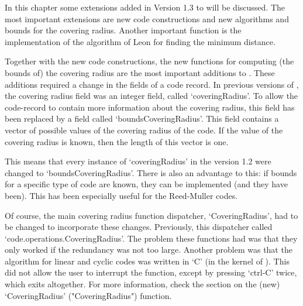 %
%
%
%

In this chapter some extensions added in Version 1.3 to {\GUAVA} will  be
discussed. The most important extensions are new code  constructions  and
new algorithms and bounds for  the  covering  radius.  Another  important
function is the implementation of the algorithm of Leon for  finding  the
minimum distance.


Together with the new code constructions, the new functions for computing
(the bounds of) the covering radius are the most important  additions  to
{\GUAVA}.
These additions required a change in the fields  of  a  code  record.  In
previous versions of {\GUAVA}, the covering radius field was  an  integer
field, called `coveringRadius'. To allow the code-record to contain  more
information about the covering radius, this field has been replaced by  a
field called `boundsCoveringRadius'. This  field  contains  a  vector  of
possible values of the covering radius of the code. If the value  of  the
covering radius is known, then the length of this vector is one.

This means that every instance of `coveringRadius'  in  the  version  1.2
were changed to `boundsCoveringRadius'. There is  also  an  advantage  to
this: if bounds for a specific type  of  code  are  known,  they  can  be
implemented (and they have been). This has been especially useful for the
Reed-Muller codes.

Of   course,   the   main   covering    radius    function    dispatcher,
`CoveringRadius',  had  to  be  changed  to  incorporate  these  changes.
Previously, this dispatcher called `code.operations.CoveringRadius'.  The
problem these functions had was that they only worked if  the  redundancy
was not too large. Another problem was that the algorithm for linear  and
cyclic codes was written in `C' (in the kernel of {\GAP}). This  did  not
allow the user to interrupt the function,  except  by  pressing  `ctrl-C'
twice, which exits {\GAP} altogether. For  more  information,  check  the
section on the (new) `CoveringRadius' ("CoveringRadius") function.

